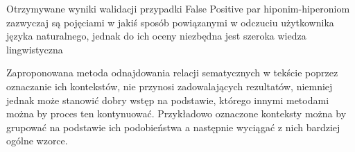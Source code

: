 \documentclass[a4paper,10pt]{report}
\begin{document}
Otrzymywane wyniki walidacji przypadki False Positive par hiponim-hiperoniom zazwyczaj są pojęciami w jakiś sposób powiązanymi w odczuciu użytkownika języka naturalnego, jednak do ich oceny niezbędna jest szeroka wiedza lingwistyczna

\begin{center}
\vspace{0.5cm}
\vspace{0.5cm}
\end{center}

Zaproponowana metoda odnajdowania relacji sematycznych w tekście poprzez oznaczanie ich kontekstów, nie przynosi zadowalających rezultatów, niemniej jednak może stanowić dobry wstęp na podstawie, którego innymi metodami można by proces ten kontynuować. Przykładowo oznaczone konteksty można by grupować na podstawie ich podobieństwa a następnie wyciągać z nich bardziej ogólne wzorce.


\nocite{*}

\end{document}
